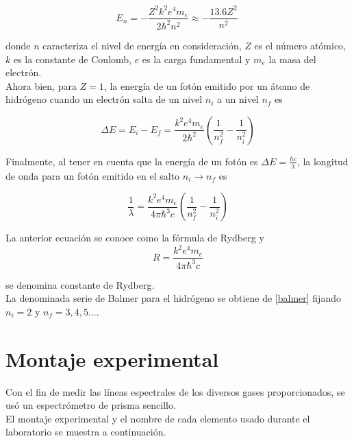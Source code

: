 \documentclass[prb,aps,twocolumn,preprintnumbers,amsmath,amssymb]{revtex4}
\begin{document}
\begin{equation}
E_{n} = -\frac{Z^2 k^2 e^4 m_{e}}{2 \hbar^2 n^2} \approx -\frac{13.6 Z^2}{n^2}\    
\end{equation}

\noindent
donde $n$ caracteriza el nivel de energía en consideración, $Z$ es el número atómico, $k$ es la constante de Coulomb, $e$ es la carga fundamental y $m_{e}$ la masa del electrón.
\\
Ahora bien, para $Z = 1$, la energía de un fotón emitido por un átomo de hidrógeno cuando un electrón salta de un nivel $n_{i}$ a un nivel $n_{f}$ es

\begin{equation}
\Delta E = E_{i} - E_{f} = \frac{k^2 e^4 m_{e}}{2 \hbar ^2} \left(\frac{1}{n_{f}^2}- \frac{1}{n_{i}^2} \right)  
\end{equation}

Finalmente, al tener en cuenta que la energía de un fotón es $\Delta E = \frac{hc}{\lambda}$, la longitud de onda para un fotón emitido en el salto $n_{i} \rightarrow n_{f}$ es

\begin{equation}
\label{balmer}
\frac{1}{\lambda} = \frac{k^2 e^4 m_{e}}{4 \pi \hbar ^3 c} \left(\frac{1}{n_{f}^2}- \frac{1}{n_{i}^2} \right)  
\end{equation}

La anterior ecuación se conoce como la fórmula de Rydberg y 
\\

\begin{equation}
\label{rydberg}
R = \frac{k^2 e^4 m_{e}}{4 \pi \hbar ^3 c}
\end{equation}

se denomina constante de Rydberg.\\

La denominada serie de Balmer para el hidrógeno se obtiene de \eqref{balmer} fijando $n_{i} = 2$ y $n_{f} = 3,4,5 \dots$.
\section{Montaje experimental}

Con el fin de medir las líneas espectrales de los diversos gases proporcionados, se usó un espectrómetro de prisma sencillo.\\ 

El montaje experimental y el nombre de cada elemento usado durante el laboratorio se muestra a continuación.\\
\end{document}
